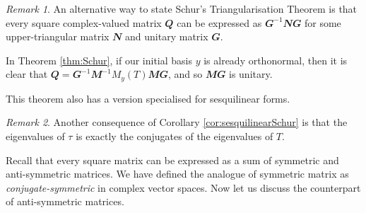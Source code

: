 \documentclass[math, code]{amznotes}
\makeatletter
\let\save@mathaccent\mathaccent
\newcommand*\if@single[3]{%
  \setbox0\hbox{${\mathaccent"0362{#1}}^H$}%
  \setbox2\hbox{${\mathaccent"0362{\kern0pt#1}}^H$}%
  \ifdim\ht0=\ht2 #3\else #2\fi
  }
\newcommand*\rel@kern[1]{\kern#1\dimexpr\macc@kerna}
\newcommand*\widebar[1]{\@ifnextchar^{{\wide@bar{#1}{0}}}{\wide@bar{#1}{1}}}
\newcommand*\wide@bar[2]{\if@single{#1}{\wide@bar@{#1}{#2}{1}}{\wide@bar@{#1}{#2}{2}}}
\newcommand*\wide@bar@[3]{%
  \begingroup
  \def\mathaccent##1##2{%
    \let\mathaccent\save@mathaccent
    \if#32 \let\macc@nucleus\first@char \fi
    \setbox\z@\hbox{$\macc@style{\macc@nucleus}_{}$}%
    \setbox\tw@\hbox{$\macc@style{\macc@nucleus}{}_{}$}%
    \dimen@\wd\tw@
    \advance\dimen@-\wd\z@
    \divide\dimen@ 3
    \@tempdima\wd\tw@
    \advance\@tempdima-\scriptspace
    \divide\@tempdima 10
    \advance\dimen@-\@tempdima
    \ifdim\dimen@>\z@ \dimen@0pt\fi
    \rel@kern{0.6}\kern-\dimen@
    \if#31
      \overline{\rel@kern{-0.6}\kern\dimen@\macc@nucleus\rel@kern{0.4}\kern\dimen@}%
      \advance\dimen@0.4\dimexpr\macc@kerna
      \let\final@kern#2%
      \ifdim\dimen@<\z@ \let\final@kern1\fi
      \if\final@kern1 \kern-\dimen@\fi
    \else
      \overline{\rel@kern{-0.6}\kern\dimen@#1}%
    \fi
  }%
  \macc@depth\@ne
  \let\math@bgroup\@empty \let\math@egroup\macc@set@skewchar
  \mathsurround\z@ \frozen@everymath{\mathgroup\macc@group\relax}%
  \macc@set@skewchar\relax
  \let\mathaccentV\macc@nested@a
  \if#31
    \macc@nested@a\relax111{#1}%
  \else
    \def\gobble@till@marker##1\endmarker{}%
    \futurelet\first@char\gobble@till@marker#1\endmarker
    \ifcat\noexpand\first@char A\else
      \def\first@char{}%
    \fi
    \macc@nested@a\relax111{\first@char}%
  \fi
  \endgroup
}
\theoremstyle{remark}
\newtheorem*{remark}{Remark}
\makeatother
\begin{document}
    \begin{notebox}
        \begin{remark}
            An alternative way to state Schur's Triangularisation Theorem is that every square complex-valued matrix $\mathbfit{Q}$ can be expressed as $\mathbfit{G}^{-1}\mathbfit{N}\mathbfit{G}$ for some upper-triangular matrix $\mathbfit{N}$ and unitary matrix $\mathbfit{G}$.
        \end{remark}
    \end{notebox}
    In Theorem \ref{thm:Schur}, if our initial basis $y$ is already orthonormal, then it is clear that $\mathbfit{Q} = \mathbfit{G}^{-1}\mathbfit{M}^{-1}M_y(T)\mathbfit{M}\mathbfit{G}$, and so $\mathbfit{M}\mathbfit{G}$ is unitary.

    This theorem also has a version specialised for sesquilinear forms.
    \begin{notebox}
        \begin{remark}
            Another consequence of Corollary \ref{cor:sesquilinearSchur} is that the eigenvalues of $\tau$ is exactly the conjugates of the eigenvalues of $T$.
        \end{remark}
    \end{notebox}
    Recall that every square matrix can be expressed as a sum of symmetric and anti-symmetric matrices. We have defined the analogue of symmetric matrix as \textit{conjugate-symmetric} in complex vector spaces. Now let us discuss the counterpart of anti-symmetric matrices.
\end{document}
